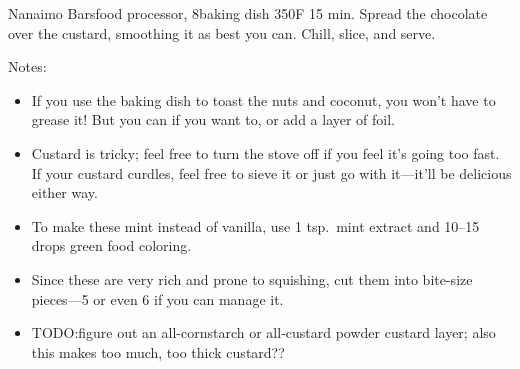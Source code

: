 \begin{recipe}[Nanaimo]{Nanaimo Bars}{food processor, 8\inch{}\inch baking dish \hfill 350\0F \hfill 15 min.}
 \newstep Spread the chocolate over the custard, smoothing it as best you can. Chill, slice, and serve.

 \freeform Notes:
 \begin{itemize}
  \item  If you use the baking dish to toast the nuts and coconut, you won't have to grease it! But you can if you want to, or add a layer of foil.
  \item Custard is tricky; feel free to turn the stove off if you feel it's going too fast. If your custard curdles, feel free to sieve it or just go with it---it'll be delicious either way.
  \item To make these mint instead of vanilla, use 1 tsp.\ mint extract and 10--15 drops green food coloring.
  \item Since these are very rich and prone to squishing, cut them into bite-size pieces---5 or even 6 if you can manage it.
  \item TODO:\@ figure out an all-cornstarch or all-custard powder custard layer; also this makes too much, too thick custard??
 \end{itemize}
\end{recipe}
